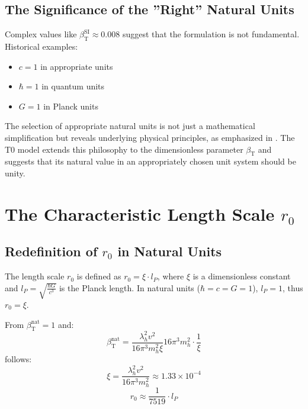 \documentclass[12pt,a4paper]{article}
\newcommand{\betaT}{\beta_{\text{T}}}
\begin{document}
	\subsection{The Significance of the ''Right'' Natural Units}
	\label{subsec:right_natural_units}
	
	Complex values like \(\betaT^{\text{SI}} \approx 0.008\) suggest that the formulation is not fundamental. Historical examples:
	\begin{itemize}
		\item \(c = 1\) in appropriate units
		\item \(\hbar = 1\) in quantum units
		\item \(G = 1\) in Planck units
	\end{itemize}
	
	The selection of appropriate natural units is not just a mathematical simplification but reveals underlying physical principles, as emphasized in \cite{pascher_zeit_masse_2025}. The T0 model extends this philosophy to the dimensionless parameter \(\betaT\) and suggests that its natural value in an appropriately chosen unit system should be unity.
	
	\section{The Characteristic Length Scale \(r_0\)}
	\label{sec:length_scale}
	
	\subsection{Redefinition of \(r_0\) in Natural Units}
	\label{subsec:r0_redefinition}
	
	The length scale \(r_0\) is defined as \(r_0 = \xi \cdot l_P\), where \(\xi\) is a dimensionless constant and \(l_P = \sqrt{\frac{\hbar G}{c^3}}\) is the Planck length. In natural units (\(\hbar = c = G = 1\)), \(l_P = 1\), thus \(r_0 = \xi\).
	
	From \(\betaT^{\text{nat}} = 1\) and:
	\begin{equation}
		\betaT^{\text{nat}} = \frac{\lambda_h^2 v^2}{16\pi^3 m_h^2 \xi}{16\pi^3 m_h^2} \cdot \frac{1}{\xi}
	\end{equation}
	follows:
	\begin{equation}
		\xi = \frac{\lambda_h^2 v^2}{16\pi^3 m_h^2} \approx 1.33 \times 10^{-4}
	\end{equation}
	\begin{equation}
		r_0 \approx \frac{1}{7519} \cdot l_P
	\end{equation}
	
\end{document}
